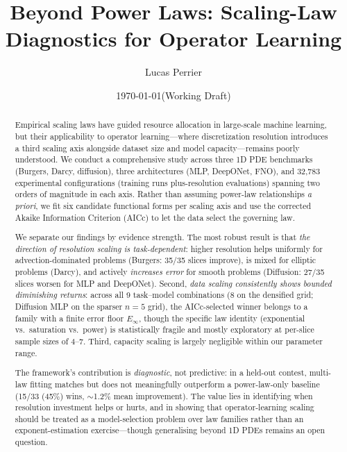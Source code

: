 \documentclass[11pt]{article}
\title{%
  Beyond Power Laws: Scaling-Law Diagnostics for Operator Learning%
}
\author{Lucas Perrier}
\date{\today \quad (Working Draft)}
\newcommand{\Einf}{E_\infty}
\newcommand{\holdoutWinFraction}{15/33 (45\%)}
\newcommand{\holdoutMeanImprovement}{1.2\%}
\newcommand{\totalRuns}{32{,}783}
\begin{document}
\maketitle

\begin{abstract}
Empirical scaling laws have guided resource allocation in large-scale machine
learning, but their applicability to operator learning---where discretization
resolution introduces a third scaling axis alongside dataset size and model
capacity---remains poorly understood.
We conduct a comprehensive study across three 1D PDE benchmarks (Burgers,
Darcy, diffusion), three architectures (MLP, DeepONet, FNO), and
\totalRuns{} experimental configurations (training runs plus\ncross-resolution evaluations) spanning two orders of magnitude in each axis.
Rather than assuming power-law relationships \emph{a priori}, we fit six
candidate functional forms per scaling axis and use the corrected Akaike
Information Criterion (AICc) to let the data select the governing law.

We separate our findings by evidence strength.
The most robust result is that \emph{the direction of resolution scaling
is task-dependent}: higher resolution helps uniformly for
advection-dominated problems (Burgers: 35/35 slices improve),
is mixed for elliptic problems (Darcy), and actively
\emph{increases error} for smooth problems (Diffusion: 27/35
slices worsen for MLP and DeepONet).
Second, \emph{data scaling consistently shows bounded diminishing
returns}: across all 9 task--model combinations (8 on the densified
grid; Diffusion MLP on the sparser $n=5$ grid),
the AICc-selected winner belongs to a family with a finite error floor
$\Einf$, though the specific law identity (exponential vs.\
saturation vs.\ power) is statistically fragile and mostly
exploratory at per-slice sample sizes of 4--7.
Third, capacity scaling is largely negligible within our parameter range.

The framework's contribution is \emph{diagnostic}, not predictive:
in a held-out contest, multi-law fitting matches but does not
meaningfully outperform a power-law-only baseline (\holdoutWinFraction{}
wins, ${\sim}$\holdoutMeanImprovement{} mean improvement).
The value lies in identifying when resolution investment helps or
hurts, and in showing that operator-learning scaling should be treated
as a model-selection problem over law families rather than an
exponent-estimation exercise---though generalising beyond 1D PDEs
remains an open question.
\end{abstract}
\end{document}
